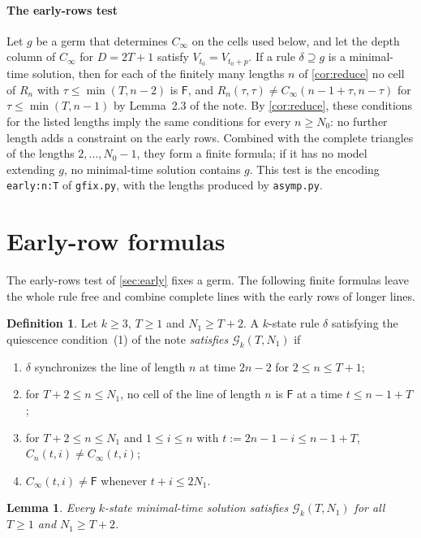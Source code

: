 \documentclass[11pt]{article}
\newtheorem{lemma}[theorem]{Lemma}
\theoremstyle{definition}
\newtheorem{definition}[theorem]{Definition}
\theoremstyle{remark}
\newcommand{\Fq}{\mathsf F}
\begin{document}
\paragraph{The early-rows test} Let $g$ be a germ that determines $C_\infty$
on the cells used below, and let the depth column of $C_\infty$ for $D=2T+1$
satisfy $V_{t_0}=V_{t_0+p}$. If a rule $\delta\supseteq g$ is a minimal-time
solution, then for each of the finitely many lengths $n$ of
\cref{cor:reduce} no cell of $R_n$ with $\tau\le\min(T,n-2)$ is $\Fq$, and
$R_n(\tau,\tau)\ne C_\infty(n-1+\tau,n-\tau)$ for $\tau\le\min(T,n-1)$ by
Lemma~2.3 of the note. By \cref{cor:reduce}, these conditions for the listed
lengths imply the same conditions for every $n\ge N_0$: no further length adds
a constraint on the early rows. Combined with the complete triangles of the
lengths $2,\dots,N_0-1$, they form a finite formula; if it has no model
extending $g$, no minimal-time solution contains $g$. This test is the encoding
\texttt{early:n:T} of \texttt{gfix.py}, with the lengths produced by
\texttt{asymp.py}.

\section{Early-row formulas}\label{sec:G}

The early-rows test of \cref{sec:early} fixes a germ. The following finite
formulas leave the whole rule free and combine complete lines with the early
rows of longer lines.

\begin{definition}\label{def:G}
Let $k\ge3$, $T\ge1$ and $N_1\ge T+2$. A $k$-state rule $\delta$ satisfying the
quiescence condition~(1) of the note \emph{satisfies $\mathcal G_k(T,N_1)$} if
\begin{enumerate}[(G1)]
\item $\delta$ synchronizes the line of length $n$ at time $2n-2$ for
$2\le n\le T+1$;
\item for $T+2\le n\le N_1$, no cell of the line of length $n$ is $\Fq$ at a
time $t\le n-1+T$;
\item for $T+2\le n\le N_1$ and $1\le i\le n$ with $t:=2n-1-i\le n-1+T$,
$C_n(t,i)\ne C_\infty(t,i)$;
\item $C_\infty(t,i)\ne\Fq$ whenever $t+i\le 2N_1$.
\end{enumerate}
\end{definition}

\begin{lemma}\label{lem:G}
Every $k$-state minimal-time solution satisfies $\mathcal G_k(T,N_1)$ for all
$T\ge1$ and $N_1\ge T+2$.
\end{lemma}
\end{document}
